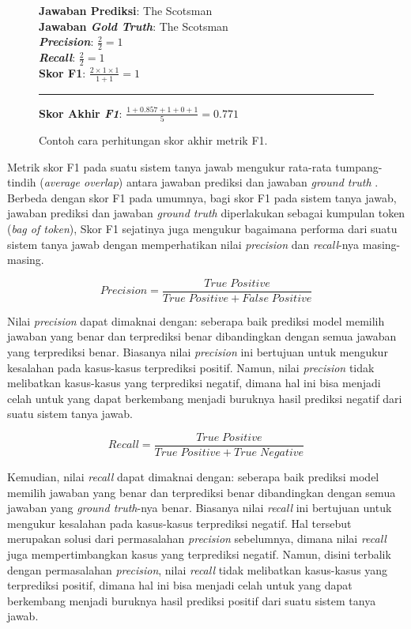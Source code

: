 \begin{figure}[h]
\textbf{Jawaban Prediksi}: The Scotsman\\
\textbf{Jawaban \emph{Gold Truth}}: The Scotsman\\
\textbf{\emph{Precision}}: $\frac{2}{2}=1$\\
\textbf{\emph{Recall}}: $\frac{2}{2}=1$\\
\textbf{Skor F1}: $\frac{2 \times 1 \times 1}{1 + 1}=1$

\vspace{3pt}
\hrule
\vspace{3pt}

\textbf{Skor Akhir \emph{F1}}: $\frac{1+0.857+1+0+1}{5}=0.771$

\centering
\caption{Contoh cara perhitungan skor akhir metrik F1.}
\end{figure}

Metrik skor F1  pada suatu sistem tanya jawab mengukur rata-rata tumpang-tindih (\emph{average overlap}) antara jawaban prediksi dan jawaban \emph{ground truth} \citep{rajpurkar-etal-2016-squad}. Berbeda dengan skor F1 pada umumnya, bagi \citeauthor{rajpurkar-etal-2016-squad} skor F1 pada sistem tanya jawab, jawaban prediksi dan jawaban \emph{ground truth} diperlakukan sebagai kumpulan token (\emph{bag of token}), Skor F1 sejatinya juga mengukur bagaimana performa dari suatu sistem tanya jawab dengan memperhatikan nilai \emph{precision} dan \emph{recall}-nya masing-masing. 


\begin{equation}
Precision = \frac{True \; Positive}{True \; Positive + False \; Positive}
\end{equation}

Nilai \emph{precision} dapat dimaknai dengan: seberapa baik prediksi model memilih jawaban yang benar dan terprediksi benar dibandingkan dengan semua jawaban yang terprediksi benar. Biasanya nilai \emph{precision} ini bertujuan untuk mengukur kesalahan pada kasus-kasus terprediksi positif. Namun, nilai \emph{precision} tidak melibatkan kasus-kasus yang terprediksi negatif, dimana hal ini bisa menjadi celah untuk yang dapat berkembang menjadi buruknya hasil prediksi negatif dari suatu sistem tanya jawab.

\begin{equation}
Recall = \frac{True \; Positive}{True \; Positive + True \; Negative}
\end{equation}

Kemudian, nilai \emph{recall} dapat dimaknai dengan: seberapa baik prediksi model memilih jawaban yang benar dan terprediksi benar dibandingkan dengan semua jawaban yang \emph{ground truth}-nya benar. Biasanya nilai \emph{recall} ini bertujuan untuk mengukur kesalahan pada kasus-kasus terprediksi negatif. Hal tersebut merupakan solusi dari permasalahan \emph{precision} sebelumnya, dimana nilai \emph{recall} juga mempertimbangkan kasus yang terprediksi negatif. Namun, disini terbalik dengan permasalahan \emph{precision}, nilai \emph{recall} tidak melibatkan kasus-kasus yang terprediksi positif, dimana hal ini bisa menjadi celah untuk yang dapat berkembang menjadi buruknya hasil prediksi positif dari suatu sistem tanya jawab.

